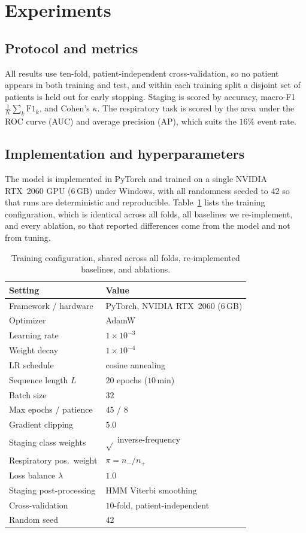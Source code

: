 \documentclass[preprint,12pt]{elsarticle}
\begin{document}
\section{Experiments}
\label{sec:results}
\subsection{Protocol and metrics}
All results use ten-fold, patient-independent cross-validation, so no patient appears in both
training and test, and within each training split a disjoint set of patients is held out for
early stopping. Staging is scored by accuracy, macro-F1 $\tfrac{1}{K}\sum_k\mathrm{F1}_k$, and
Cohen's $\kappa$. The respiratory task is scored by the area under the ROC curve (AUC) and
average precision (AP), which suits the $16\%$ event rate.

\subsection{Implementation and hyperparameters}
The model is implemented in PyTorch and trained on a single NVIDIA RTX~2060 GPU (6\,GB) under
Windows, with all randomness seeded to $42$ so that runs are deterministic and reproducible.
Table~\ref{tab:hyper} lists the training configuration, which is identical across all folds, all
baselines we re-implement, and every ablation, so that reported differences come from the model
and not from tuning.

\begin{table}[t]
\caption{Training configuration, shared across all folds, re-implemented baselines, and ablations.}
\label{tab:hyper}
\centering
\small
\begin{tabular}{ll}
\toprule
Setting & Value \\
\midrule
Framework / hardware & PyTorch, NVIDIA RTX~2060 (6\,GB) \\
Optimizer & AdamW \\
Learning rate & $1\times10^{-3}$ \\
Weight decay & $1\times10^{-4}$ \\
LR schedule & cosine annealing \\
Sequence length $L$ & $20$ epochs ($10$\,min) \\
Batch size & $32$ \\
Max epochs / patience & $45$ / $8$ \\
Gradient clipping & $5.0$ \\
Staging class weights & $\sqrt{}$ inverse-frequency \\
Respiratory pos.\ weight & $\pi=n_-/n_+$ \\
Loss balance $\lambda$ & $1.0$ \\
Staging post-processing & HMM Viterbi smoothing \\
Cross-validation & $10$-fold, patient-independent \\
Random seed & $42$ \\
\bottomrule
\end{tabular}
\end{table}
\end{document}
